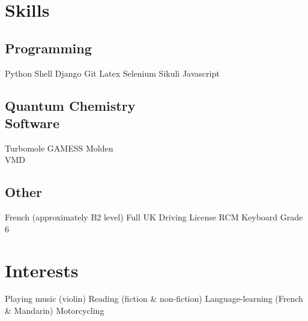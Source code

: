\documentclass[letterpaper]{deedy-resume} %
\begin{document}
\begin{minipage}[t]{0.33\textwidth}
\sectionspace %


\section{Skills}

\subsection{Programming}

Python \textbullet{} Shell \textbullet{} Django \textbullet{} Git \textbullet{} Latex \textbullet{} Selenium \textbullet{} Sikuli \textbullet{} Javascript

\sectionspace %

\subsection[]{Quantum Chemistry \\ Software}

Turbomole \textbullet{} GAMESS \textbullet{} Molden \\
\textbullet{} VMD 

\sectionspace %

\subsection[]{Other}

French (approximately B2 level) \textbullet{} Full UK Driving License \textbullet{} RCM Keyboard Grade 6

\sectionspace %

\section{Interests}

Playing music (violin) \textbullet{} Reading (fiction \& non-fiction) \textbullet{} Language-learning (French \& Mandarin) \textbullet{} Motorcycling \\


\end{minipage} %
\end{document}

